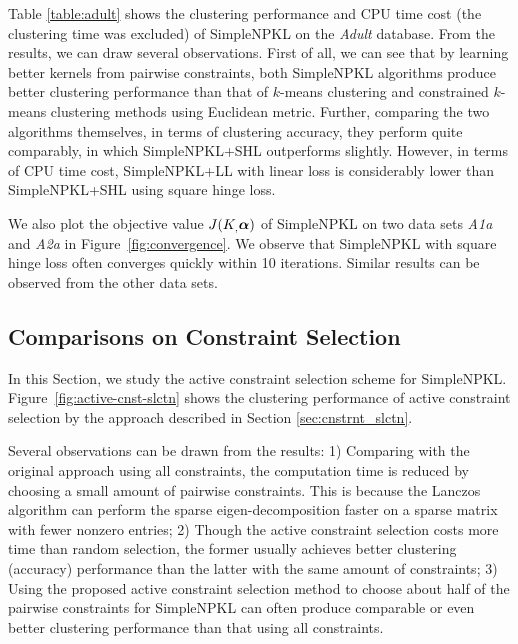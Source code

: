 Table \ref{table:adult} shows the clustering performance and CPU time cost (the
clustering time was excluded) of SimpleNPKL on the {\it Adult} database. From the
results, we can draw several observations. First of all, we can see that by learning
better kernels from pairwise constraints, both SimpleNPKL algorithms produce better
clustering performance than that of $k$-means clustering and constrained $k$-means clustering methods using Euclidean metric. Further, comparing
the two algorithms themselves, in terms of clustering accuracy, they perform quite
comparably, in which SimpleNPKL+SHL outperforms slightly. However, in terms of
CPU time cost, SimpleNPKL+LL with linear loss is considerably lower than
SimpleNPKL+SHL using square hinge loss.

We also plot the objective value $J(K_,{\boldsymbol{\alpha}})$ of SimpleNPKL on two data sets {\em
A1a} and {\em A2a} in Figure~\ref{fig:convergence}. We observe that SimpleNPKL
with square hinge loss often converges quickly within 10 iterations. Similar results can
be observed from the other data sets.

\subsection{Comparisons on Constraint Selection}

In this Section, we study the active constraint selection scheme for SimpleNPKL. Figure~\ref{fig:active-cnst-slctn} shows the clustering
performance of active constraint selection by the approach described in Section \ref{sec:cnstrnt_slctn}.

Several observations can be drawn from the results: 1) Comparing with the original approach using all constraints, the computation time is reduced by choosing a small amount of pairwise constraints. This is because the Lanczos algorithm can perform the sparse eigen-decomposition faster on a sparse matrix with fewer nonzero entries; 2) Though the active constraint selection costs more time than random selection, the former usually achieves better clustering (accuracy) performance than the latter with the same amount of constraints; 3) Using the proposed active constraint selection method to choose about half of the pairwise constraints for SimpleNPKL can often produce comparable or even better clustering performance than that using all constraints.

